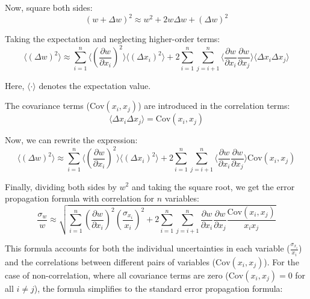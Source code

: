 \documentclass{article}
\begin{document}
Now, square both sides:
\begin{equation}
(w + \Delta w)^2 \approx w^2 + 2w\Delta w + (\Delta w)^2
\end{equation}

Taking the expectation and neglecting higher-order terms:
\begin{equation}
\langle (\Delta w)^2 \rangle \approx \sum_{i=1}^{n} \langle \left(\frac{\partial w}{\partial x_i}\right)^2 \rangle \langle (\Delta x_i)^2 \rangle + 2 \sum_{i=1}^{n} \sum_{j=i+1}^{n} \langle \frac{\partial w}{\partial x_i} \frac{\partial w}{\partial x_j} \rangle \langle \Delta x_i \Delta x_j \rangle
\end{equation}

Here, \( \langle \cdot \rangle \) denotes the expectation value.

The covariance terms (\( \text{Cov}(x_i, x_j) \)) are introduced in the correlation terms:
\begin{equation}
\langle \Delta x_i \Delta x_j \rangle = \text{Cov}(x_i, x_j)
\end{equation}

Now, we can rewrite the expression:
\begin{equation}
\langle (\Delta w)^2 \rangle \approx \sum_{i=1}^{n} \langle \left(\frac{\partial w}{\partial x_i}\right)^2 \rangle \langle (\Delta x_i)^2 \rangle + 2 \sum_{i=1}^{n} \sum_{j=i+1}^{n} \langle \frac{\partial w}{\partial x_i} \frac{\partial w}{\partial x_j} \rangle \text{Cov}(x_i, x_j)
\end{equation}

Finally, dividing both sides by \(w^2\) and taking the square root, we get the error propagation formula with correlation for \( n \) variables\cite{articleb}\cite{taylor2022introduction}\cite{weisstein2000error}\cite{LUO201723}:
\begin{equation}
\frac{\sigma_w}{w} \approx \sqrt{\sum_{i=1}^{n} \left(\frac{\partial w}{\partial x_i}\right)^2 \left(\frac{\sigma_{x_i}}{x_i}\right)^2 + 2 \sum_{i=1}^{n} \sum_{j=i+1}^{n} \frac{\partial w}{\partial x_i} \frac{\partial w}{\partial x_j} \frac{\text{Cov}(x_i, x_j)}{x_i x_j}}
\end{equation}

This formula accounts for both the individual uncertainties in each variable (\( \frac{\sigma_{x_i}}{x_i} \)) and the correlations between different pairs of variables (\( \text{Cov}(x_i, x_j) \)). For the case of non-correlation, where all covariance terms are zero (\( \text{Cov}(x_i, x_j) = 0 \) for all \( i \neq j \)), the formula simplifies to the standard error propagation formula:
\end{document}
